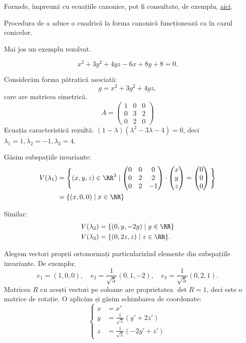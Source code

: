 Formele, împreună cu ecuațiile canonice, pot fi consultate, de exemplu,
\href{https://en.wikipedia.org/wiki/Quadric#Euclidean_space}{aici}.

Procedura de a aduce o cuadrică la forma canonică funcționează ca în cazul
conicelor.

Mai jos un exemplu rezolvat.

\[
  x^2 + 3y^2 + 4yz - 6x + 8y + 8 = 0.
\]

Considerăm forma pătratică asociată:
\[
  g = x^2 + 3y^2 + 4yz,
\]
care are matricea simetrică.
\[
  A = \begin{pmatrix}
    1 & 0 & 0 \\
    0 & 3 & 2 \\
    0 & 2 & 0
  \end{pmatrix}
\]
Ecuația caracteristică rezultă: $(1 - \lambda)(\lambda^2 - 3\lambda - 4) = 0$,
deci $\lambda_1 = 1, \lambda_2 = -1, \lambda_3 = 4$.

Găsim subspațiile invariante:
\begin{align*}
  V(\lambda_1) &= \Bigg\{ (x, y, z) \in \RR^3 \mid %
                 \begin{pmatrix}
                   0 & 0 & 0 \\
                   0 & 2 & 2 \\
                   0 & 2 & -1
                 \end{pmatrix} \cdot
                           \begin{pmatrix}
                             x \\ y \\ z
                           \end{pmatrix}  =
  \begin{pmatrix}
    0 \\ 0 \\ 0
  \end{pmatrix} \Bigg\} \\
               &= \{ (x, 0, 0) \mid x \in \RR \}
\end{align*}

Similar:
\begin{align*}
  V(\lambda_2) &= \{ (0, y, -2y) \mid y \in \RR \} \\
  V(\lambda_3) &= \{ (0, 2z, z) \mid z \in \RR \}.
\end{align*}

Alegem vectori proprii ortonormați particularizînd elemente din
subspațiile invariante.
De exemplu:
\[
  e_1 = (1, 0, 0), \quad e_2 = \frac{1}{\sqrt{5}} (0, 1, -2), %
  \quad e_3 = \frac{1}{\sqrt{5}}(0, 2, 1).
\]
Matricea $R$ cu acești vectori pe coloane are proprietatea $\det R = 1$, deci
este o matrice de rotație. O aplicăm și găsim schimbarea de coordonate:
\[
  \begin{cases}
    x &= x' \\
    y &= \frac{1}{\sqrt{5}} (y' + 2z') \\
    z &= \frac{1}{\sqrt{5}} (-2y' + z')
  \end{cases}
\]

